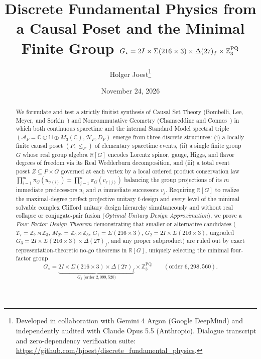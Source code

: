 \documentclass[11pt,a4paper]{article}
\title{\textbf{Discrete Fundamental Physics from a Causal Poset and the Minimal Finite Group $G_\star = 2I \times \Sigma(216 \times 3) \times \Delta(27)_f \times \Z_3^{\mathrm{PQ}}$}}
\author{Holger Joest\thanks{Developed in collaboration with Gemini 4 Argon (Google DeepMind) and independently audited with Claude Opus 5.5 (Anthropic). Dialogue transcript and zero-dependency verification suite: \url{https://github.com/hjoest/discrete_fundamental_physics}.}}
\date{November 24, 2026}
\theoremstyle{definition}
\theoremstyle{remark}
\newcommand{\R}{\mathbb{R}}
\newcommand{\C}{\mathbb{C}}
\newcommand{\quat}{\mathbb{H}}
\newcommand{\Z}{\mathbb{Z}}
\newcommand{\Gthree}{G_3}
\newcommand{\Gstar}{G_\star}
\begin{document}
\maketitle

\begin{abstract}
We formulate and test a strictly finitist synthesis of Causal Set Theory (Bombelli, Lee, Meyer, and Sorkin~\cite{Bombelli1987}) and Noncommutative Geometry (Chamseddine and Connes~\cite{ChamseddineConnes1997}) in which both continuous spacetime and the internal Standard Model spectral triple $(\mathcal{A}_F = \C \oplus \quat \oplus M_3(\C), \mathcal{H}_F, D_F)$ emerge from three discrete structures: (i) a locally finite causal poset $(P, \le_P)$ of elementary spacetime events, (ii) a single finite group $G$ whose real group algebra $\R[G]$ encodes Lorentz spinor, gauge, Higgs, and flavor degrees of freedom via its Real Wedderburn decomposition, and (iii) a total event poset $Z \subseteq P \times G$ governed at each vertex by a local ordered product conservation law $\prod_{i=1}^m \pi_G(u_{\sigma(i)}) = \prod_{j=1}^n \pi_G(v_{\tau(j)})$ balancing the group projections of its $m$ immediate predecessors $u_i$ and $n$ immediate successors $v_j$. Requiring $\R[G]$ to realize the maximal-degree perfect projective unitary $t$-design and every level of the minimal solvable complex Clifford unitary design hierarchy simultaneously and without real collapse or conjugate-pair fusion (\emph{Optimal Unitary Design Approximation}), we prove a \emph{Four-Factor Design Theorem} demonstrating that smaller or alternative candidates ($T_7 = \Z_7 \rtimes \Z_3$, $M_{27} = \Z_9 \rtimes \Z_3$, $G_1 = \Sigma(216 \times 3)$, $G_2 = 2I \times \Sigma(216 \times 3)$, ungraded $\Gthree = 2I \times \Sigma(216 \times 3) \times \Delta(27)_f$, and any proper subproduct) are ruled out by exact representation-theoretic no-go theorems in $\R[G]$, uniquely selecting the minimal four-factor group
\[
\Gstar = \underbrace{2I \times \Sigma(216 \times 3) \times \Delta(27)_f}_{\Gthree\;\text{(order }2{,}099{,}520\text{)}} \times \Z_3^{\mathrm{PQ}} \qquad (\text{order } 6{,}298{,}560).
\]

\end{abstract}
\end{document}
